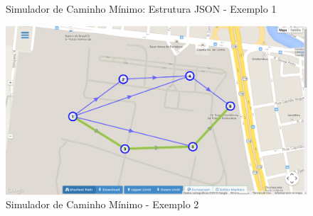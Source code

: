 
\begin{figure}[htbp]
  \caption{Simulador de Caminho Mínimo: Estrutura JSON - Exemplo 1}
  \label{fig:jsondyn1}
\end{figure}
\FloatBarrier


\begin{figure}[htbp]
\centering
 \includegraphics[width=.70\textwidth]{figuras/validacao/ex2.png}
\caption{Simulador de Caminho Mínimo - Exemplo 2}
\label{fig:ex2}
\end{figure}
\FloatBarrier

